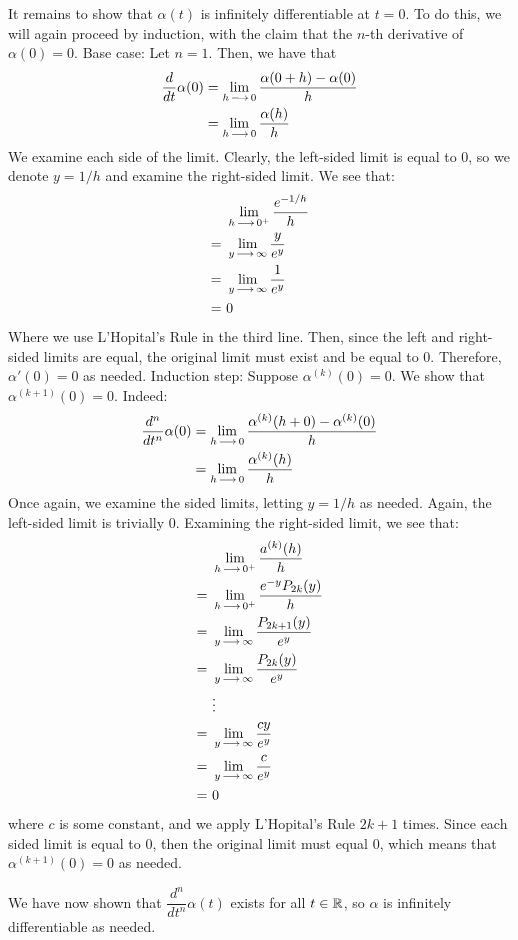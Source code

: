\begin{soln}
    It remains to show that $ \alpha(t) $ is infinitely differentiable at
    $ t = 0 $. To do this, we will again proceed by induction, with the claim
    that the $ n $-th derivative of $ \alpha(0) = 0 $. \vsp
    Base case: Let $ n = 1 $. Then, we have that
    \begin{align*}
        \frac{d}{dt} \alpha(0) & = \lim_{h\operatorname{\longrightarrow} 0} \frac{\alpha(0 + h)
        - \alpha(0)}{h} \\
                               & = \lim_{h \operatorname{\longrightarrow} 0} \frac{\alpha(h)}{h}
    \end{align*}
    We examine each side of the limit.
    Clearly, the left-sided limit is equal to 0, so we 
    denote $ y = 1/h $ and examine the right-sided limit. We see that:
    \begin{align*}
        & \lim_{ h \operatorname{\longrightarrow} 0^{+}} \frac{e^{-1/h}}{h} \\
        = \ & \lim_{y \operatorname{\longrightarrow} \infty} \frac{y}{e^{y}} \\
        = \ & \lim_{y \operatorname{\longrightarrow} \infty} \frac{1}{e^{y}} \\
        = \ & 0
    \end{align*}
    Where we use L'Hopital's Rule in the third line.
    Then, since the left and right-sided limits are equal,
    the original limit must exist and be equal to 0.
    Therefore, $ \alpha'(0) = 0 $ as needed. \vsp
    Induction step: Suppose $ \alpha^{(k)}(0) = 0 $.
    We show that $ \alpha^{(k+1)}(0) = 0 $. Indeed:
    \begin{align*}
        \frac{d^{n}}{dt^{n}} \alpha(0) & = \lim_{h \operatorname{\longrightarrow} 0} 
        \frac{\alpha^{(k)}(h + 0) - \alpha^{(k)}(0)}{h} \\
                    & = \lim_{h \operatorname{\longrightarrow} 0} \frac{\alpha^{(k)}(h)}{h}
    \end{align*}
    Once again, we examine the sided limits, letting $ y = 1/h $ as needed.
    Again, the left-sided limit is trivially 0. Examining the right-sided limit,
    we see that:
    \begin{align*}
        & \lim_{h \operatorname{\longrightarrow} 0^{+}} \frac{a^{(k)}(h)}{h} \\
        = \ & \lim_{h \operatorname{\longrightarrow} 0^{+}} \frac{e^{-y}P_{2k}(y)}{h} \\
        = \ & \lim_{y \operatorname{\longrightarrow} \infty} \frac{P_{2k+1}(y)}{e^{y}} \\
        = \ & \lim_{y \operatorname{\longrightarrow} \infty} \frac{P_{2k}(y)}{e^{y}} \\
            & \vdots \\
        = \ & \lim_{y \operatorname{\longrightarrow} \infty} \frac{cy}{e^{y}} \\
        = \ & \lim_{y \operatorname{\longrightarrow} \infty} \frac{c}{e^{y}} \\
        = \ & 0
    \end{align*}
    where $ c $ is some constant, and we apply L'Hopital's Rule $ 2k + 1 $ times.
    Since each sided limit is equal to 0, then the original limit must equal 0,
    which means that $ \alpha^{(k+1)}(0) = 0 $ as needed. \npgh

    We have now shown that $ \dfrac{d^{n}}{dt^{n}} \alpha(t) $ exists for all $ t \in \mathbb{R} $,
    so $ \alpha $ is infinitely differentiable as needed.
\end{soln}

